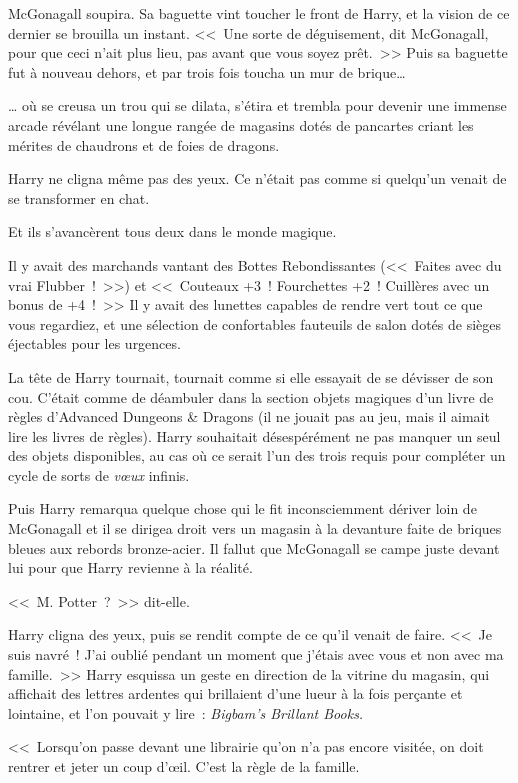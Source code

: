 McGonagall soupira. Sa baguette vint toucher le front de Harry, et la vision de ce dernier se brouilla un instant. <<~Une sorte de déguisement, dit McGonagall, pour que ceci n'ait plus lieu, pas avant que vous soyez prêt.~>> Puis sa baguette fut à nouveau dehors, et par trois fois toucha un mur de brique\ldots{}

\ldots{} où se creusa un trou qui se dilata, s'étira et trembla pour devenir une immense arcade révélant une longue rangée de magasins dotés de pancartes criant les mérites de chaudrons et de foies de dragons.

Harry ne cligna même pas des yeux. Ce n'était pas comme si quelqu'un venait de se transformer en chat.

Et ils s'avancèrent tous deux dans le monde magique.

Il y avait des marchands vantant des Bottes Rebondissantes (<<~Faites avec du vrai Flubber~!~>>) et <<~Couteaux +3~! Fourchettes +2~! Cuillères avec un bonus de +4~!~>> Il y avait des lunettes capables de rendre vert tout ce que vous regardiez, et une sélection de confortables fauteuils de salon dotés de sièges éjectables pour les urgences.

La tête de Harry tournait, tournait comme si elle essayait de se dévisser de son cou. C'était comme de déambuler dans la section objets magiques d'un livre de règles d'Advanced Dungeons \& Dragons (il ne jouait pas au jeu, mais il aimait lire les livres de règles). Harry souhaitait désespérément ne pas manquer un seul des objets disponibles, au cas où ce serait l'un des trois requis pour compléter un cycle de sorts de \emph{v\oe{}ux} infinis.

Puis Harry remarqua quelque chose qui le fit inconsciemment dériver loin de McGonagall et il se dirigea droit vers un magasin à la devanture faite de briques bleues aux rebords bronze-acier. Il fallut que McGonagall se campe juste devant lui pour que Harry revienne à la réalité.

<<~M. Potter~?~>> dit-elle.

Harry cligna des yeux, puis se rendit compte de ce qu'il venait de faire. <<~Je suis navré~! J'ai oublié pendant un moment que j'étais avec vous et non avec ma famille.~>> Harry esquissa un geste en direction de la vitrine du magasin, qui affichait des lettres ardentes qui brillaient d'une lueur à la fois perçante et lointaine, et l'on pouvait y lire~: \emph{Bigbam's Brillant Books.}

<<~Lorsqu'on passe devant une librairie qu'on n'a pas encore visitée, on doit rentrer et jeter un coup d'\oe{}il. C'est la règle de la famille.

